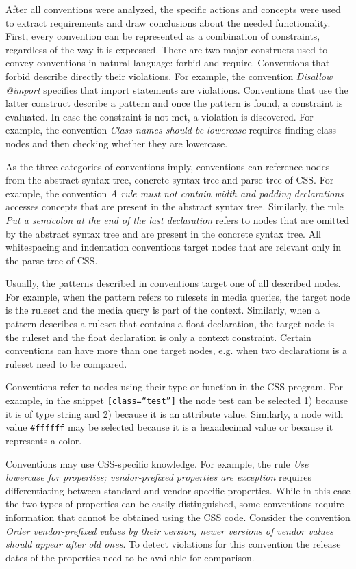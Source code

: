After all conventions were analyzed, the specific actions and concepts were
used to extract requirements and draw conclusions about the needed
functionality. First, every convention can be represented as a combination of
constraints, regardless of the way it is expressed. There are two major
constructs used to convey conventions in natural language: forbid and require.
Conventions that forbid describe directly their violations. For example, the
convention \textit{Disallow @import} specifies that import statements are
violations. Conventions that use the latter construct describe a pattern and
once the pattern is found, a constraint is evaluated. In case the constraint
is not met, a violation is discovered. For example, the convention
\textit{Class names should be lowercase} requires finding class nodes and then
checking whether they are lowercase.

As the three categories of conventions imply, conventions can reference nodes
from the abstract syntax tree, concrete syntax tree and parse tree of CSS. For
example, the convention \textit{A rule must not contain width and padding
declarations} accesses concepts that are present in the abstract syntax tree.
Similarly, the rule \textit{Put a semicolon at the end of the last
declaration} refers to nodes that are omitted by the abstract syntax tree and
are present in the concrete syntax tree. All whitespacing and indentation
conventions target nodes that are relevant only in the parse tree of CSS.

Usually, the patterns described in conventions target one of all described
nodes. For example, when the pattern refers to rulesets in media queries, the
target node is the ruleset and the media query is part of the context.
Similarly, when a pattern describes a ruleset that contains a float
declaration, the target node is the ruleset and the float declaration is only
a context constraint. Certain conventions can have more than one target nodes,
e.g. when two declarations is a ruleset need to be compared.

Conventions refer to nodes using their type or function in the CSS program.
For example, in the snippet \texttt{[class=``test'']} the node test can be
selected 1) because it is of type string and 2) because it is an attribute
value. Similarly, a node with value \texttt{\#ffffff} may be selected because
it is a hexadecimal value or because it represents a color.

Conventions may use CSS-specific knowledge. For example, the rule \textit{Use
lowercase for properties; vendor-prefixed properties are exception} requires
differentiating between standard and vendor-specific properties. While in this
case the two types of properties can be easily distinguished, some conventions
require information that cannot be obtained using the CSS code. Consider the
convention \textit{Order vendor-prefixed values by their version; newer
versions of vendor values should appear after old ones}. To detect violations
for this convention the release dates of the properties need to be available
for comparison.

